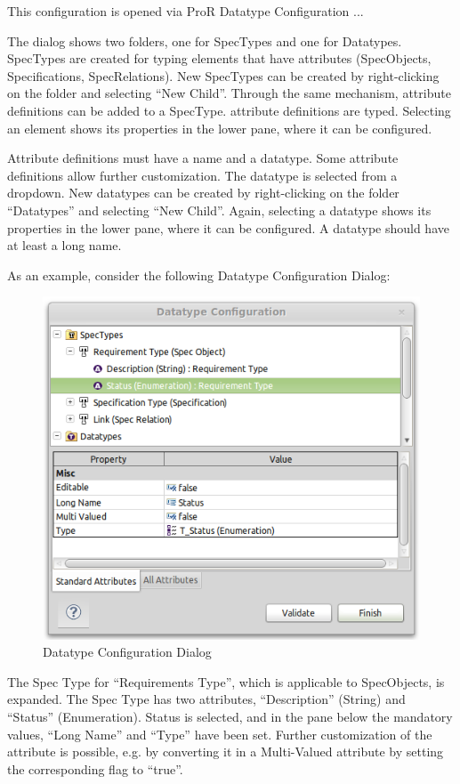 This configuration is opened via ProR \textbar{} Datatype Configuration
...

The dialog shows two folders, one for SpecTypes and one for Datatypes.
SpecTypes are created for typing elements that have attributes
(SpecObjects, Specifications, SpecRelations). New SpecTypes can be
created by right-clicking on the folder and selecting ``New Child''.
Through the same mechanism, attribute definitions can be added to a
SpecType. attribute definitions are typed. Selecting an element shows
its properties in the lower pane, where it can be configured.

Attribute definitions must have a name and a datatype. Some attribute
definitions allow further customization. The datatype is selected from a
dropdown. New datatypes can be created by right-clicking on the folder
``Datatypes'' and selecting ``New Child''. Again, selecting a datatype
shows its properties in the lower pane, where it can be configured. A
datatype should have at least a long name.

As an example, consider the following Datatype Configuration Dialog:

\begin{figure}[h!]
\centering      
\includegraphics[width=0.8\linewidth]{../rmf-images/pror_datatype_configuration.png}
\caption{Datatype Configuration Dialog}      
\label{fig:DatatypeConfig}
\end{figure}

The Spec Type for ``Requirements Type'', which is applicable to
SpecObjects, is expanded. The Spec Type has two attributes,
``Description'' (String) and ``Status'' (Enumeration). Status is
selected, and in the pane below the mandatory values, ``Long Name'' and
``Type'' have been set. Further customization of the attribute is
possible, e.g. by converting it in a Multi-Valued attribute by setting
the corresponding flag to ``true''.

